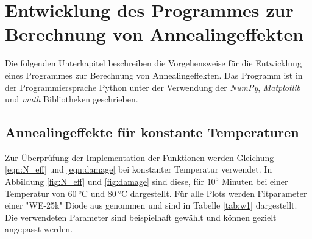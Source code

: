 \chapter{Entwicklung des Programmes zur Berechnung von Annealingeffekten}\label{make}
Die folgenden Unterkapitel beschreiben die Vorgehensweise für die Entwicklung  eines Programmes zur
Berechnung von Annealingeffekten. Das Programm ist in der Programmiersprache Python unter
der Verwendung der \textit{NumPy}, \textit{Matplotlib} und \textit{math} Bibliotheken geschrieben.
\section{Annealingeffekte für konstante Temperaturen}
Zur Überprüfung der Implementation der Funktionen werden
Gleichung \ref{eqn:N_eff} und \ref{eqn:damage}  bei konstanter Temperatur verwendet. In
Abbildung \ref{fig:N_eff} und \ref{fig:damage} sind diese, für $10^5$ Minuten bei einer Temperatur
von $\SI{60}{\celsius}$ und $\SI{80}{\celsius}$  dargestellt.
Für alle Plots werden Fitparameter
einer "WE-25k" Diode aus \cite{moll} genommen und sind in Tabelle \ref{tab:w1} dargestellt. Die verwendeten
Parameter sind beispielhaft gewählt und können gezielt angepasst werden.


